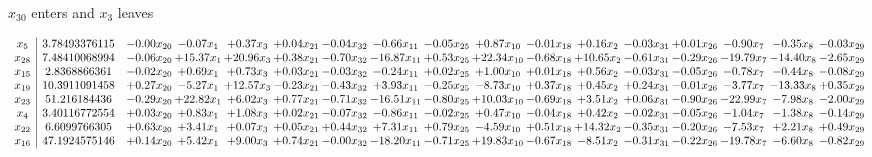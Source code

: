 \documentclass[9pt]{article}
\begin{document}
 $ x_{30} $ enters and $ x_{3} $ leaves 

 \[\begin{array}{c| c c@{\hskip 2pt} c@{\hskip 2pt} c@{\hskip 2pt} c@{\hskip 2pt} c@{\hskip 2pt} c@{\hskip 2pt} c@{\hskip 2pt} c@{\hskip 2pt} c@{\hskip 2pt} c@{\hskip 2pt} c@{\hskip 2pt} c@{\hskip 2pt} c@{\hskip 2pt} c@{\hskip 2pt} c@{\hskip 2pt} }
 x_{5}   &  3.78493376115 & -0.00 x_{20} & -0.07 x_{1} & +  0.37 x_{3} & +  0.04 x_{21} & -0.04 x_{32} & -0.66 x_{11} & -0.05 x_{25} & +  0.87 x_{10} & -0.01 x_{18} & +  0.16 x_{2} & -0.03 x_{31} & +  0.01 x_{26} & -0.90 x_{7} & -0.35 x_{8} & -0.03 x_{29}\\
 x_{28}   &  7.48410068994 & -0.06 x_{20} & + 15.37 x_{1} & + 20.96 x_{3} & +  0.38 x_{21} & -0.70 x_{32} & -16.87 x_{11} & +  0.53 x_{25} & + 22.34 x_{10} & -0.68 x_{18} & + 10.65 x_{2} & -0.61 x_{31} & -0.29 x_{26} & -19.79 x_{7} & -14.40 x_{8} & -2.65 x_{29}\\
 x_{15}   &  2.8368866361 & -0.02 x_{20} & +  0.69 x_{1} & +  0.73 x_{3} & +  0.03 x_{21} & -0.03 x_{32} & -0.24 x_{11} & +  0.02 x_{25} & +  1.00 x_{10} & +  0.01 x_{18} & +  0.56 x_{2} & -0.03 x_{31} & -0.05 x_{26} & -0.78 x_{7} & -0.44 x_{8} & -0.08 x_{29}\\
 x_{19}   &  10.3911091458 & +  0.27 x_{20} & -5.27 x_{1} & + 12.57 x_{3} & -0.23 x_{21} & -0.43 x_{32} & +  3.93 x_{11} & -0.25 x_{25} & -8.73 x_{10} & +  0.37 x_{18} & +  0.45 x_{2} & +  0.24 x_{31} & -0.01 x_{26} & -3.77 x_{7} & -13.33 x_{8} & +  0.35 x_{29}\\
 x_{23}   &  51.216184436 & -0.29 x_{20} & + 22.82 x_{1} & +  6.02 x_{3} & +  0.77 x_{21} & -0.71 x_{32} & -16.51 x_{11} & -0.80 x_{25} & + 10.03 x_{10} & -0.69 x_{18} & +  3.51 x_{2} & +  0.06 x_{31} & -0.90 x_{26} & -22.99 x_{7} & -7.98 x_{8} & -2.00 x_{29}\\
 x_{4}   &  3.40116772554 & +  0.03 x_{20} & +  0.83 x_{1} & +  1.08 x_{3} & +  0.02 x_{21} & -0.07 x_{32} & -0.86 x_{11} & -0.02 x_{25} & +  0.47 x_{10} & -0.04 x_{18} & +  0.42 x_{2} & -0.02 x_{31} & -0.05 x_{26} & -1.04 x_{7} & -1.38 x_{8} & -0.14 x_{29}\\
 x_{22}   &  6.6099766305 & +  0.63 x_{20} & +  3.41 x_{1} & +  0.07 x_{3} & +  0.05 x_{21} & +  0.44 x_{32} & +  7.31 x_{11} & +  0.79 x_{25} & -4.59 x_{10} & +  0.51 x_{18} & + 14.32 x_{2} & -0.35 x_{31} & -0.20 x_{26} & -7.53 x_{7} & +  2.21 x_{8} & +  0.49 x_{29}\\
 x_{16}   &  47.1924575146 & +  0.14 x_{20} & +  5.42 x_{1} & +  9.00 x_{3} & +  0.74 x_{21} & -0.00 x_{32} & -18.20 x_{11} & -0.71 x_{25} & + 19.83 x_{10} & -0.67 x_{18} & -8.51 x_{2} & -0.31 x_{31} & -0.22 x_{26} & -19.78 x_{7} & -6.60 x_{8} & -0.82 x_{29}\\

\end{array}\]
\end{document}
